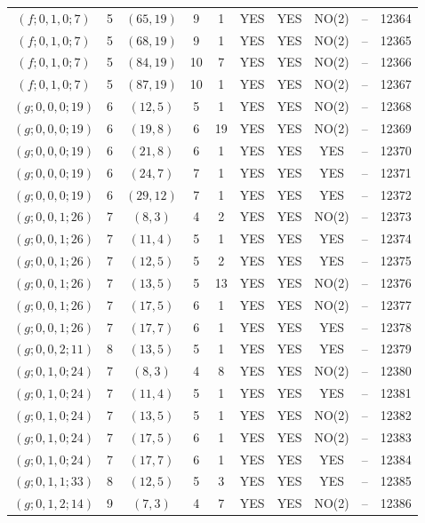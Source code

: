 \begin{longtable}{|c|c|c|c|c|c|c|c|c|c|}
$(f; 0, 1, 0; 7)$ & 5 & $(65, 19)$ & 9 & 1 & YES & YES & NO(2) & -- & 12364\\
$(f; 0, 1, 0; 7)$ & 5 & $(68, 19)$ & 9 & 1 & YES & YES & NO(2) & -- & 12365\\
$(f; 0, 1, 0; 7)$ & 5 & $(84, 19)$ & 10 & 7 & YES & YES & NO(2) & -- & 12366\\
$(f; 0, 1, 0; 7)$ & 5 & $(87, 19)$ & 10 & 1 & YES & YES & NO(2) & -- & 12367\\
$(g; 0, 0, 0; 19)$ & 6 & $(12, 5)$ & 5 & 1 & YES & YES & NO(2) & -- & 12368\\
$(g; 0, 0, 0; 19)$ & 6 & $(19, 8)$ & 6 & 19 & YES & YES & NO(2) & -- & 12369\\
$(g; 0, 0, 0; 19)$ & 6 & $(21, 8)$ & 6 & 1 & YES & YES & YES & -- & 12370\\
$(g; 0, 0, 0; 19)$ & 6 & $(24, 7)$ & 7 & 1 & YES & YES & YES & -- & 12371\\
$(g; 0, 0, 0; 19)$ & 6 & $(29, 12)$ & 7 & 1 & YES & YES & YES & -- & 12372\\
$(g; 0, 0, 1; 26)$ & 7 & $(8, 3)$ & 4 & 2 & YES & YES & NO(2) & -- & 12373\\
$(g; 0, 0, 1; 26)$ & 7 & $(11, 4)$ & 5 & 1 & YES & YES & YES & -- & 12374\\
$(g; 0, 0, 1; 26)$ & 7 & $(12, 5)$ & 5 & 2 & YES & YES & YES & -- & 12375\\
$(g; 0, 0, 1; 26)$ & 7 & $(13, 5)$ & 5 & 13 & YES & YES & NO(2) & -- & 12376\\
$(g; 0, 0, 1; 26)$ & 7 & $(17, 5)$ & 6 & 1 & YES & YES & NO(2) & -- & 12377\\
$(g; 0, 0, 1; 26)$ & 7 & $(17, 7)$ & 6 & 1 & YES & YES & YES & -- & 12378\\
$(g; 0, 0, 2; 11)$ & 8 & $(13, 5)$ & 5 & 1 & YES & YES & YES & -- & 12379\\
$(g; 0, 1, 0; 24)$ & 7 & $(8, 3)$ & 4 & 8 & YES & YES & NO(2) & -- & 12380\\
$(g; 0, 1, 0; 24)$ & 7 & $(11, 4)$ & 5 & 1 & YES & YES & YES & -- & 12381\\
$(g; 0, 1, 0; 24)$ & 7 & $(13, 5)$ & 5 & 1 & YES & YES & NO(2) & -- & 12382\\
$(g; 0, 1, 0; 24)$ & 7 & $(17, 5)$ & 6 & 1 & YES & YES & NO(2) & -- & 12383\\
$(g; 0, 1, 0; 24)$ & 7 & $(17, 7)$ & 6 & 1 & YES & YES & YES & -- & 12384\\
$(g; 0, 1, 1; 33)$ & 8 & $(12, 5)$ & 5 & 3 & YES & YES & YES & -- & 12385\\
$(g; 0, 1, 2; 14)$ & 9 & $(7, 3)$ & 4 & 7 & YES & YES & NO(2) & -- & 12386\\

\end{longtable}
